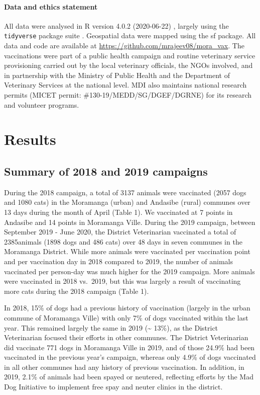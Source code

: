 \documentclass[tropicalmed,article,submit,moreauthors,pdftex]{mdpi}
\begin{document}
\hypertarget{data-and-ethics-statement}{%
\paragraph{Data and ethics statement}\label{data-and-ethics-statement}}

All data were analysed in R version 4.0.2 (2020-06-22) \citep{R2020},
largely using the \texttt{tidyverse} package suite \citep{wickham2019}.
Geospatial data were mapped using the sf \citep{sf} package. All data
and code are available at \url{https://github.com/mrajeev08/mora_vax}.
The vaccinations were part of a public health campaign and routine
veterinary service provisioning carried out by the local veterinary
officials, the NGOs involved, and in partnership with the Ministry of
Public Health and the Department of Veterinary Services at the national
level. MDI also maintains national research permits (MICET permit:
\#130-19/MEDD/SG/DGEF/DGRNE) for its research and volunteer programs.

\hypertarget{results}{%
\section{Results}\label{results}}

\hypertarget{summary-of-2018-and-2019-campaigns}{%
\subsection{Summary of 2018 and 2019
campaigns}\label{summary-of-2018-and-2019-campaigns}}

During the 2018 campaign, a total of 3137 animals were vaccinated (2057
dogs and 1080 cats) in the Moramanga (urban) and Andasibe (rural)
communes over 13 days during the month of April (Table 1). We vaccinated
at 7 points in Andasibe and 14 points in Moramanga Ville. During the
2019 campaign, between September 2019 - June 2020, the District
Veterinarian vaccinated a total of 2385animals (1898 dogs and 486 cats)
over 48 days in seven communes in the Moramanga District. While more
animals were vaccinated per vaccination point and per vaccination day in
2018 compared to 2019, the number of animals vaccinated per person-day
was much higher for the 2019 campaign. More animals were vaccinated in
2018 vs.~2019, but this was largely a result of vaccinating more cats
during the 2018 campaign (Table 1).

In 2018, 15\% of dogs had a previous history of vaccination (largely in
the urban commune of Moramanga Ville) with only 7\% of dogs vaccinated
within the last year. This remained largely the same in 2019
(\textasciitilde{} 13\%), as the District Veterinarian focused their
efforts in other communes. The District Veterinarian did vaccinate 771
dogs in Moramanga Ville in 2019, and of those 24.9\% had been vaccinated
in the previous year's campaign, whereas only 4.9\% of dogs vaccinated
in all other communes had any history of previous vaccination. In
addition, in 2019, 2.1\% of animals had been spayed or neutered,
reflecting efforts by the Mad Dog Initiative to implement free spay and
neuter clinics in the district.
\end{document}
